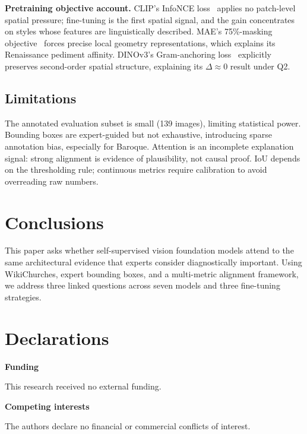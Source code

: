 \documentclass[lineno,pdflatex,sn-mathphys-num]{sn-jnl}%
\theoremstyle{thmstyleone}%
\theoremstyle{thmstyletwo}%
\theoremstyle{thmstylethree}%
\begin{document}
\textbf{Pretraining objective account.} CLIP's InfoNCE loss~\cite{Radford21CLIP} applies no patch-level spatial pressure; fine-tuning is the first spatial signal, and the gain concentrates on styles whose features are linguistically described. MAE's 75\%-masking objective~\cite{He22MAE} forces precise local geometry representations, which explains its Renaissance pediment affinity. DINOv3's Gram-anchoring loss~\cite{Simeoni26DINOv3} explicitly preserves second-order spatial structure, explaining its $\Delta\!\approx\!0$ result under Q2.


\subsection{Limitations}

The annotated evaluation subset is small (139 images), limiting statistical power. Bounding boxes are expert-guided but not exhaustive, introducing sparse annotation bias, especially for Baroque. Attention is an incomplete explanation signal: strong alignment is evidence of plausibility, not causal proof. IoU depends on the thresholding rule; continuous metrics require calibration to avoid overreading raw numbers.

\section{Conclusions} \label{section conclusions}

This paper asks whether self-supervised vision foundation models attend to the same architectural evidence that experts consider diagnostically important. Using WikiChurches, expert bounding boxes, and a multi-metric alignment framework, we address three linked questions across seven models and three fine-tuning strategies.





\backmatter


\section*{Declarations}

\textbf{Funding}

This research received no external funding. \newline

\noindent\textbf{Competing interests}

The authors declare no financial or commercial conflicts of interest. \newline
\end{document}
